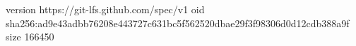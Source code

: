 version https://git-lfs.github.com/spec/v1
oid sha256:ad9e43adbb76208e443727c631bc5f562520dbae29f3f98306d0d12cdb388a9f
size 166450
